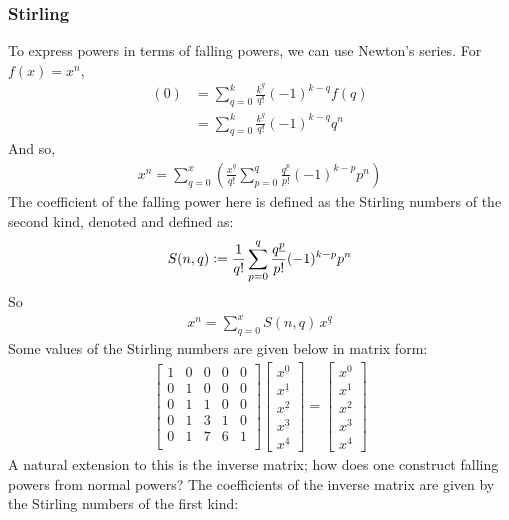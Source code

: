 \documentclass{article}
\renewcommand\({\left(}
\renewcommand\){\right)}
\begin{document}
\subsubsection{Stirling}
To express powers in terms of falling powers, we can use Newton's series. For $f(x)=x^n$,
\begin{align*}
    [\Delta^k f](0)&=\sum_{q=0}^k\frac{k^{\underline{q}}}{q!}(-1)^{k-q}f(q)\\
    &=\sum_{q=0}^k\frac{k^{\underline{q}}}{q!}(-1)^{k-q}q^n
\end{align*}
And so, 
\begin{align*}
    x^n=\sum_{q=0}^{x}\left(\frac{x^{\underline{q}}}{q!}\sum_{p=0}^q\frac{q^{\underline{p}}}{p!}(-1)^{k-p}p^n\right)
\end{align*}
The coefficient of the falling power here is defined as the Stirling numbers of the second kind, denoted and defined as:
\begin{align*}
    S(n,q)\vcentcolon=\frac{1}{q!}\sum_{p=0}^q\frac{q^{\underline{p}}}{p!}(-1)^{k-p}p^n
\end{align*}
So
\begin{align*}
    x^n=\sum_{q=0}^{x}S(n,q)\,x^{\underline{q}}
\end{align*}
Some values of the Stirling numbers are given below in matrix form:
\begin{align*}
    \begin{bmatrix}
 1 & 0 & 0 & 0 & 0 \\
 0 & 1 & 0 & 0 & 0 \\
 0 & 1 & 1 & 0 & 0 \\
 0 & 1 & 3 & 1 & 0 \\
 0 & 1 & 7 & 6 & 1 \\
    \end{bmatrix}
    \begin{bmatrix}x^{\underline{0}}\\x^{\underline{1}}\\x^{\underline{2}}\\x^{\underline{3}}\\x^{\underline{4}}\end{bmatrix}=\begin{bmatrix}x^0\\x^1\\x^2\\x^3\\x^4\end{bmatrix}
\end{align*}
A natural extension to this is the inverse matrix; how does one construct falling powers from normal powers? The coefficients of the inverse matrix are given by the Stirling numbers of the first kind:
\end{document}
